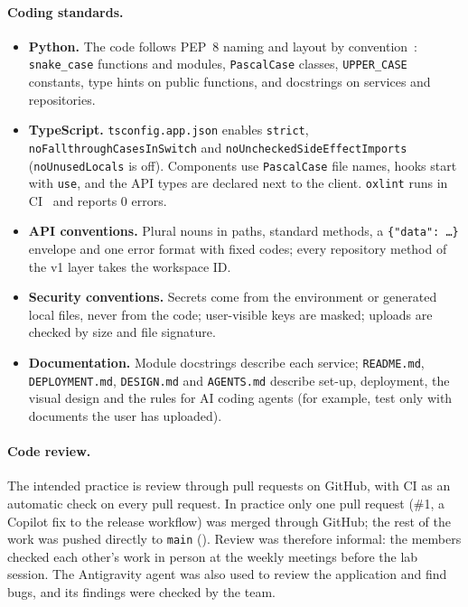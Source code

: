 \paragraph{Coding standards.}
\begin{itemize}[leftmargin=*]
  \item \textbf{Python.} The code follows PEP~8 naming and layout by
    convention~\cite{pep8}: \texttt{snake\_case} functions and modules,
    \texttt{PascalCase} classes, \texttt{UPPER\_CASE} constants, type hints on public
    functions, and docstrings on services and repositories.
  \item \textbf{TypeScript.} \texttt{tsconfig.app.json} enables \texttt{strict},
    \texttt{noFallthroughCasesInSwitch} and \texttt{noUncheckedSideEffectImports}
    (\texttt{noUnusedLocals} is off). Components use \texttt{PascalCase} file names,
    hooks start with \texttt{use}, and the API types are declared next to the client.
    \texttt{oxlint} runs in CI~\cite{oxlint} and reports 0 errors.
  \item \textbf{API conventions.} Plural nouns in paths, standard methods, a
    \texttt{\{"data": \ldots\}} envelope and one error format with fixed codes; every
    repository method of the v1 layer takes the workspace ID.
  \item \textbf{Security conventions.} Secrets come from the environment or generated
    local files, never from the code; user-visible keys are masked; uploads are checked
    by size and file signature.
  \item \textbf{Documentation.} Module docstrings describe each service; \texttt{README.md},
    \texttt{DEPLOYMENT.md}, \texttt{DESIGN.md} and \texttt{AGENTS.md} describe set-up,
    deployment, the visual design and the rules for AI coding agents (for example,
    test only with documents the user has uploaded).
\end{itemize}

\paragraph{Code review.}
The intended practice is review through pull requests on GitHub, with CI as an
automatic check on every pull request. In practice only one pull request (\#1, a
Copilot fix to the release workflow) was merged through GitHub; the rest of the work was
pushed directly to \texttt{main} (). Review was therefore informal: the
members checked each other's work in person at the weekly meetings before the lab
session. The Antigravity agent was also used to review the application and find bugs,
and its findings were checked by the team.
